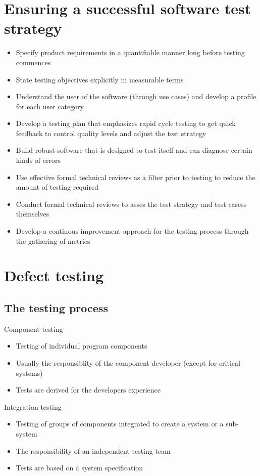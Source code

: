 \documentclass{article}
\begin{document}
\section{Ensuring a successful software test strategy}

\begin{itemize}
  \item Specify product requirements in a quantifiable manner long before testing commences
  \item State testing objectives explicitly in measurable terms
  \item Understand the user of the software (through use cases) and develop a profile for each user category
  \item Develop a testing plan that emphasizes rapid cycle testing to get quick feedback to control quality levels and adjust the test strategy
  \item Build robust software that is designed to test itself and can diagnose certain kinds of errors
  \item Use effective formal technical reviews as a filter prior to testing to reduce the amount of testing required
  \item Conduct formal technical reviews to asses the test strategy and test casess themselves
  \item Develop a continous improvement approach for the testing process through the gathering of metrics
\end{itemize}

\section{Defect testing}

\subsection{The testing process}
\begin{flushleft}
Component testing
\begin{itemize}
  \item Testing of individual program components
  \item Usually the responsiblity of the component developer (except for critical systems)
  \item Tests are derived for the developers experience
\end{itemize}
Integration testing
\begin{itemize}
  \item Testing of groups of components integrated to create a system or a sub-system
  \item The responsibility of an independent testing team
  \item Tests are based on a system specification
\end{itemize}
\end{flushleft}
\end{document}
